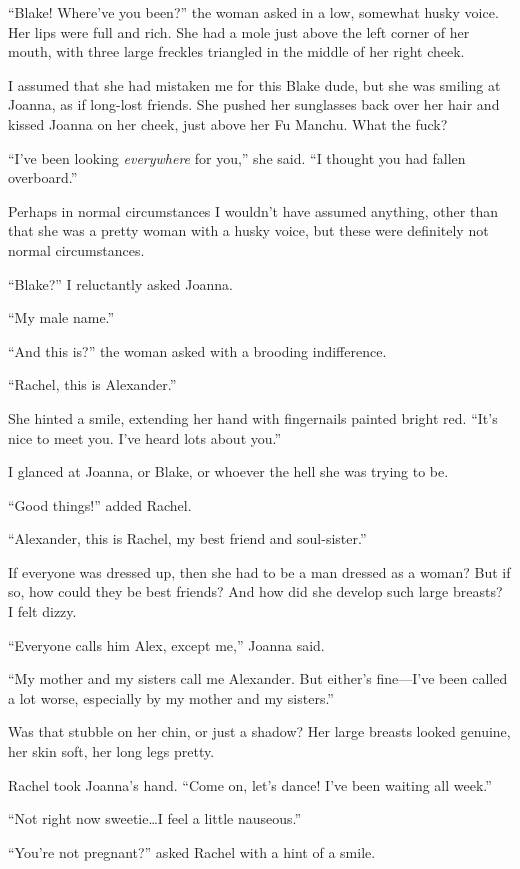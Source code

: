 ``Blake! Where've you been?'' the woman asked in a low, somewhat husky
voice. Her lips were full and rich. She had a mole just above the left
corner of her mouth, with three large freckles triangled in the middle
of her right cheek.

I assumed that she had mistaken me for this Blake dude, but she was
smiling at Joanna, as if long-lost friends. She pushed her sunglasses
back over her hair and kissed Joanna on her cheek, just above her Fu
Manchu. What the fuck?

``I've been looking \emph{everywhere} for you,'' she said. ``I thought
you had fallen overboard.''

Perhaps in normal circumstances I wouldn't have assumed anything, other
than that she was a pretty woman with a husky voice, but these were
definitely not normal circumstances.

``Blake?'' I reluctantly asked Joanna.

``My male name.''

``And this is?'' the woman asked with a brooding indifference.

``Rachel, this is Alexander.''

She hinted a smile, extending her hand with fingernails painted bright
red. ``It's nice to meet you. I've heard lots about you.''

I glanced at Joanna, or Blake, or whoever the hell she was trying to be.

``Good things!'' added Rachel.

``Alexander, this is Rachel, my best friend and soul-sister.''

If everyone was dressed up, then she had to be a man dressed as a woman?
But if so, how could they be best friends? And how did she develop such
large breasts? I felt dizzy.

``Everyone calls him Alex, except me,'' Joanna said.

``My mother and my sisters call me Alexander. But either's fine---I've
been called a lot worse, especially by my mother and my sisters.''

Was that stubble on her chin, or just a shadow? Her large breasts looked
genuine, her skin soft, her long legs pretty.

Rachel took Joanna's hand. ``Come on, let's dance! I've been waiting all
week.''

``Not right now sweetie\ldots I feel a little nauseous.''

``You're not pregnant?'' asked Rachel with a hint of a smile.

